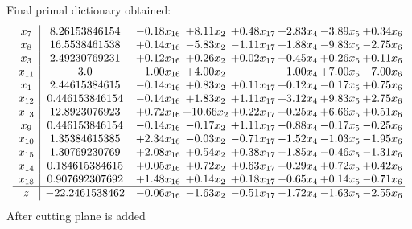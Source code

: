 \documentclass[8pt]{article}
\begin{document}
 Final primal dictionary obtained: 
\[\begin{array}{c| c c@{\hskip 2pt} c@{\hskip 2pt} c@{\hskip 2pt} c@{\hskip 2pt} c@{\hskip 2pt} c@{\hskip 2pt} }
 x_{7}   &  8.26153846154 & -0.18 x_{16} & +  8.11 x_{2} & +  0.48 x_{17} & +  2.83 x_{4} & -3.89 x_{5} & +  0.34 x_{6}\\
 x_{8}   &  16.5538461538 & +  0.14 x_{16} & -5.83 x_{2} & -1.11 x_{17} & +  1.88 x_{4} & -9.83 x_{5} & -2.75 x_{6}\\
 x_{3}   &  2.49230769231 & +  0.12 x_{16} & +  0.26 x_{2} & +  0.02 x_{17} & +  0.45 x_{4} & +  0.26 x_{5} & +  0.11 x_{6}\\
 x_{11}   &  3.0 & -1.00 x_{16} & +  4.00 x_{2} &   & +  1.00 x_{4} & +  7.00 x_{5} & -7.00 x_{6}\\
 x_{1}   &  2.44615384615 & -0.14 x_{16} & +  0.83 x_{2} & +  0.11 x_{17} & +  0.12 x_{4} & -0.17 x_{5} & +  0.75 x_{6}\\
 x_{12}   &  0.446153846154 & -0.14 x_{16} & +  1.83 x_{2} & +  1.11 x_{17} & +  3.12 x_{4} & +  9.83 x_{5} & +  2.75 x_{6}\\
 x_{13}   &  12.8923076923 & +  0.72 x_{16} & + 10.66 x_{2} & +  0.22 x_{17} & +  0.25 x_{4} & +  6.66 x_{5} & +  0.51 x_{6}\\
 x_{9}   &  0.446153846154 & -0.14 x_{16} & -0.17 x_{2} & +  1.11 x_{17} & -0.88 x_{4} & -0.17 x_{5} & -0.25 x_{6}\\
 x_{10}   &  1.35384615385 & +  2.34 x_{16} & -0.03 x_{2} & -0.71 x_{17} & -1.52 x_{4} & -1.03 x_{5} & -1.95 x_{6}\\
 x_{15}   &  1.30769230769 & +  2.08 x_{16} & +  0.54 x_{2} & +  0.38 x_{17} & -1.85 x_{4} & -0.46 x_{5} & -1.31 x_{6}\\
 x_{14}   &  0.184615384615 & +  0.05 x_{16} & +  0.72 x_{2} & +  0.63 x_{17} & +  0.29 x_{4} & +  0.72 x_{5} & +  0.42 x_{6}\\
 x_{18}   &  0.907692307692 & +  1.48 x_{16} & +  0.14 x_{2} & +  0.18 x_{17} & -0.65 x_{4} & +  0.14 x_{5} & -0.71 x_{6}\\
\hline
z    &  -22.2461538462 & -0.06 x_{16} & -1.63 x_{2} & -0.51 x_{17} & -1.72 x_{4} & -1.63 x_{5} & -2.55 x_{6}\\
\end{array}\]
 After cutting plane is added 
\end{document}
